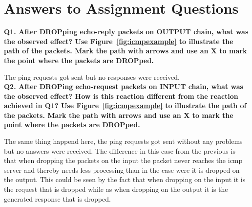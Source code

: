 \section{Answers to Assignment Questions}

\noindent \textbf{Q1. After DROPping echo-reply packets on OUTPUT chain, what 
was the observed effect? Use Figure~\ref{fig:icmpexample} to illustrate the 
path of the packets. Mark the path with arrows and use an X to mark the point 
where the packets are DROPped.}

The ping requests got sent but no responses were received.
\\

\noindent \textbf{Q2. After DROPing echo-request packets on INPUT chain, what
was the observed effect? How is this reaction different from the reaction
achieved in Q1? Use Figure~\ref{fig:icmpexample} to illustrate the path of 
the packets. Mark the path with arrows and use an X to mark the point where the
packets are DROPped.}

The same thing happend here, the ping requests got sent without any problems but 
no answers were received. The difference in this case from the previous is that
when dropping the packets on the input the packet never reaches the 
icmp server and thereby needs less processing than in the case were it is dropped
on the output. This could be seen by the fact that when dropping on the input it 
is the request that is dropped while as when dropping on the output it is the 
generated response that is dropped.
\\

